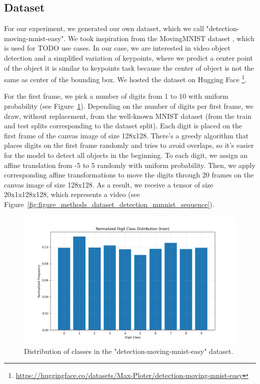 \subsection{Dataset} \label{Methods:Dataset}

For our experiment, we generated our own dataset, which we call "detection-moving-mnist-easy". We took inspiration from the MovingMNIST dataset \cite{srivastava2016unsupervisedlearningvideorepresentations}, which is used for TODO use cases. In our case, we are interested in video object detection and a simplified variation of keypoints, where we predict a center point of the object it is similar to keypoints task because the center of object is not the same as center of the bounding box. We hosted the dataset on Hugging Face \footnote{\url{https://huggingface.co/datasets/Max-Ploter/detection-moving-mnist-easy}}.

 For the first frame, we pick a number of digits from 1 to 10 with uniform probability (see Figure~\ref{fig:figure_method_dataset_train_digit_classes}). Depending on the number of digits per first frame, we draw, without replacement, from the well-known MNIST dataset \cite{} (from the train and test splits corresponding to the dataset split). Each digit is placed on the first frame of the canvas image of size 128x128. There's a greedy algorithm that places digits on the first frame randomly and tries to avoid overlaps, so it's easier for the model to detect all objects in the beginning. To each digit, we assign an affine translation from -5 to 5 randomly with uniform probability. Then, we apply corresponding affine transformations to move the digits through 20 frames on the canvas image of size 128x128. As a result, we receive a tensor of size 20x1x128x128, which represents a video (see Figure~\ref{fig:figure_methods_dataset_detection_mmnist_sequence}).

\begin{figure}
    \centering
    \includegraphics[width=\textwidth]{figures/figure_method_dataset_train_digit_classes.png}
    \caption{Distribution of classes in the "detection-moving-mnist-easy" dataset.}
    \label{fig:figure_method_dataset_train_digit_classes}
\end{figure}


